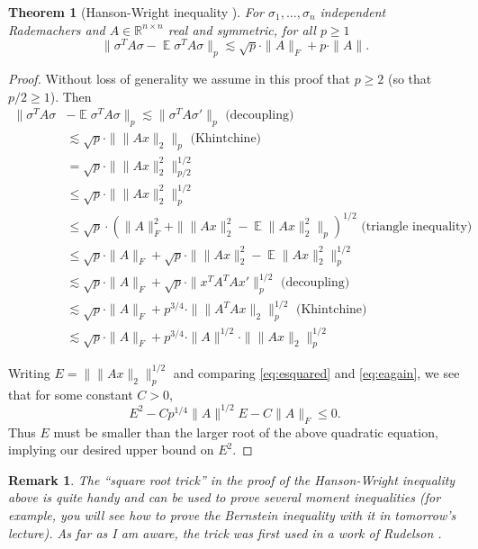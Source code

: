 \documentclass[11pt]{article}
\DeclareMathOperator*{\E}{\mathbb{E}}
\newcommand{\R}{\mathbb{R}}
\newtheorem{theorem}{Theorem}
\newtheorem{remark}{Remark}
\newcommand{\EquationName}[1]{\label{eq:#1}}
\newcommand{\Eqsub}[1]{\eqref{eq:#1}}
\begin{document}
\begin{theorem}[Hanson-Wright inequality {\cite{HansonW71}}]
For $\sigma_1,\ldots,\sigma_n$ independent Rademachers and $A\in\R^{n\times n}$ real and symmetric, for all $p\ge 1$
$$
\|\sigma^T A \sigma - \E \sigma^T A \sigma\|_p \lesssim \sqrt{p} \cdot \|A\|_F + p\cdot \|A\| .
$$
\end{theorem}
\begin{proof}
Without loss of generality we assume in this proof that $p\ge 2$ (so that $p/2 \ge 1$). Then
\allowdisplaybreaks
\begin{align}
\|\sigma^T A \sigma &- \E \sigma^T A \sigma\|_p \lesssim \|\sigma^T A \sigma'\|_p\text{ (decoupling)} \EquationName{hwstart}\\
{}&\lesssim \sqrt{p} \cdot \| \|Ax\|_2 \|_p \text{ (Khintchine)} \EquationName{esquared}\\
{}& = \sqrt{p} \cdot \| \|Ax\|_2^2 \|_{p/2}^{1/2} \EquationName{induction}\\
\nonumber {}& \le \sqrt{p} \cdot \| \|Ax\|_2^2 \|_p^{1/2} \\
\nonumber {}& \le \sqrt{p} \cdot (\|A\|_F^2 + \|\|Ax\|_2^2 - \E \|Ax\|_2^2 \|_p)^{1/2} \text{ (triangle inequality)}\\
\nonumber {}& \le \sqrt{p} \cdot \|A\|_F + \sqrt{p}\cdot \|\|Ax\|_2^2 - \E \|Ax\|_2^2 \|_p^{1/2}\\
\nonumber {}& \lesssim \sqrt{p} \cdot \|A\|_F + \sqrt{p}\cdot \|x^T A^T A x'\|_p^{1/2}\text{ (decoupling)}\\
\nonumber {}& \lesssim \sqrt{p} \cdot \|A\|_F + p^{3/4}\cdot \|\|A^T Ax\|_2\|_p^{1/2}\text{ (Khintchine)}\\
{}& \lesssim \sqrt{p} \cdot \|A\|_F + p^{3/4}\cdot\|A\|^{1/2} \cdot\|\|Ax\|_2\|_p^{1/2} \EquationName{eagain}
\end{align}

Writing $E = \|\|Ax\|_2\|_p^{1/2}$ and comparing \Eqsub{esquared} and \Eqsub{eagain}, we see that for some constant $C > 0$,
$$
E^2 - Cp^{1/4}\|A\|^{1/2} E - C\|A\|_F \le 0 .
$$
Thus $E$ must be smaller than the larger root of the above quadratic equation, implying our desired upper bound on $E^2$.
\end{proof}

\begin{remark}
\textup{
The ``square root trick'' in the proof of the Hanson-Wright inequality above is quite handy and can be used to prove several moment inequalities (for example, you will see how to prove the Bernstein inequality with it in tomorrow's lecture). As far as I am aware, the trick was first used in a work of Rudelson \cite{Rudelson99}.
}
\end{remark}
\end{document}
